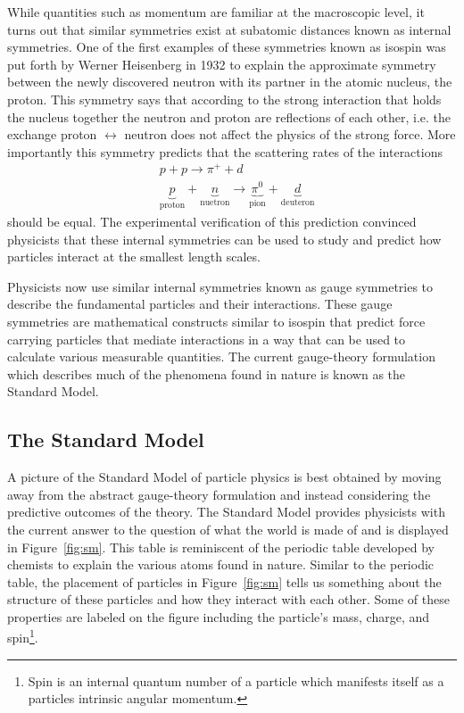 While quantities such as momentum are familiar at the macroscopic level, 
it turns out that similar symmetries exist at subatomic distances
known as internal symmetries. One of the first examples of these symmetries
known as isospin was put forth by Werner Heisenberg in 1932 
to explain the approximate symmetry between
the newly discovered neutron with its partner in the atomic nucleus, the proton.
This symmetry says that according to the strong interaction that holds
the nucleus together the neutron and proton are reflections of each other,
i.e. the exchange proton $\leftrightarrow$ neutron does not affect the
physics of the strong force. More importantly this symmetry predicts that the
scattering rates of the interactions
\begin{align*}
    & p + p \rightarrow \pi^+ + d \\
    & \underbrace{p}_{\text{proton}} + \underbrace{n}_{\text{nuetron}} \rightarrow \underbrace{\pi^0}_{\text{pion}} + \underbrace{d}_{\text{deuteron}}
\end{align*}
should be equal. The experimental verification of this prediction convinced
physicists that these internal symmetries can be used to study and predict
how particles interact at the smallest length scales.

Physicists now use similar internal symmetries known as gauge symmetries to
describe the fundamental particles and their interactions. These gauge symmetries
are mathematical constructs similar to isospin that predict force carrying 
particles that mediate interactions in a way that can be used to calculate
various measurable quantities. The current gauge-theory formulation which describes
much of the phenomena found in nature is known as the Standard Model.

\subsection{The Standard Model}
\label{subsec:StandardModel}
A picture of the Standard Model of particle physics is best obtained
by moving away from the abstract gauge-theory formulation and instead considering
the predictive outcomes of the theory. The Standard Model provides physicists with
the current answer to the question of what the world is made of and is displayed
in Figure~\ref{fig:sm}. This table is reminiscent
of the periodic table developed by chemists to explain the various atoms
found in nature. Similar to the periodic table, the placement of particles in 
Figure~\ref{fig:sm} tells us something about the structure of these particles and
how they interact with each other. Some of these properties are labeled on
the figure including the particle's mass, charge, and 
spin\footnote{Spin is an internal quantum number of a particle which manifests 
itself as a particles intrinsic angular momentum.}.

